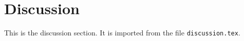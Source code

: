 \section{Discussion}
This is the discussion section.
It is imported from the file \verb+discussion.tex+.
